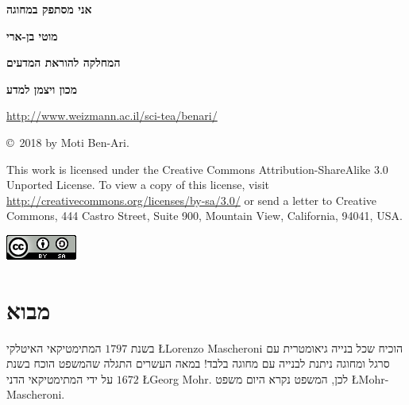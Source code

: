 \documentclass[12pt,a4paper]{article}
\begin{document}
\thispagestyle{empty}


\begin{center}
\textbf{\Huge%
אני מסתפק במחוגה%
}

\bigskip
\bigskip
\bigskip
\bigskip

\textbf{\Large מוטי בן-ארי}

\bigskip

\textbf{\Large המחלקה להוראת המדעים}

\bigskip

\textbf{\Large מכון ויצמן למדע}

\bigskip

\url{http://www.weizmann.ac.il/sci-tea/benari/}
\end{center}

\bigskip
\bigskip
\bigskip
\bigskip

\begin{center}
\copyright{}\  2018 by Moti Ben-Ari.

\end{center}


{\small This work is licensed under the Creative Commons Attribution-ShareAlike 3.0 Unported License. To view a copy of this license, visit \url{http://creativecommons.org/licenses/by-sa/3.0/} or send a letter to Creative Commons, 444 Castro Street, Suite 900, Mountain View, California, 94041, USA.}

\bigskip

\begin{center}
\includegraphics[width=.2\textwidth]{../by-sa.png}
\end{center}


\newpage


\section{%
מבוא
}\label{s.intro}
בשנת
$1797$
המתימטיקאי האיטלקי
\L{Lorenzo Mascheroni}
הוכיח שכל בנייה גיאומטרית עם סרגל ומחוגה ניתנת לבנייה עם מחוגה בלבד! במאה העשרים התגלה שהמשפט הוכח בשנת
$1672$
על ידי המתימטיקאי הדני
\L{Georg Mohr}.
לכן, המשפט נקרא היום משפט
\L{Mohr-Mascheroni}.
\end{document}
